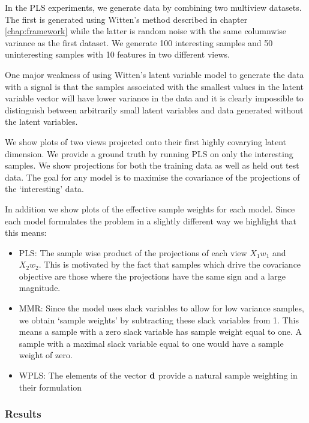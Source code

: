 In the PLS experiments, we generate data by combining two multiview datasets. The first is generated using Witten's method described in chapter \ref{chap:framework} while the latter is random noise with the same columnwise variance as the first dataset. We generate 100 interesting samples and 50 uninteresting samples with 10 features in two different views.

One major weakness of using Witten's latent variable model to generate the data with a signal is that the samples associated with the smallest values in the latent variable vector will have lower variance in the data and it is clearly impossible to distinguish between arbitrarily small latent variables and data generated without the latent variables.

We show plots of two views projected onto their first highly covarying latent dimension. We provide a ground truth by running PLS on only the interesting samples. We show projections for both the training data as well as held out test data. The goal for any model is to maximise the covariance of the projections of the `interesting' data.

In addition we show plots of the effective sample weights for each model. Since each model formulates the problem in a slightly different way we highlight that this means:

\begin{itemize}
    \item PLS: The sample wise product of the projections of each view $X_1w_1$ and $X_2w_2$. This is motivated by the fact that samples which drive the covariance objective are those where the projections have the same sign and a large magnitude.
    \item MMR: Since the model uses slack variables to allow for low variance samples, we obtain `sample weights' by subtracting these slack variables from 1. This means a sample with a zero slack variable has sample weight equal to one. A sample with a maximal slack variable equal to one would have a sample weight of zero.
    \item WPLS: The elements of the vector $\bold{d}$ provide a natural sample weighting in their formulation
    
\end{itemize}

\subsubsection{Results}

